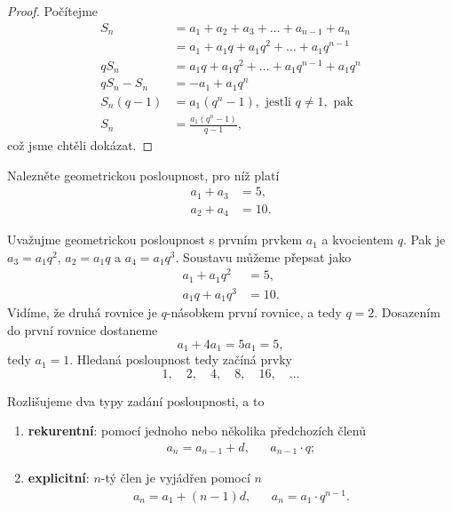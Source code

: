 \begin{proof}
Počítejme
\begin{align*}
    S_n &= a_1+a_2+a_3+\dots+a_{n-1}+a_n \\
    &= a_1 + a_1q+ a_1q^2+ \dots + a_1q^{n-1}\\
    qS_n &= a_1q + a_1q^2 +  \dots + a_1q^{n-1} + a_1q^n\\
    qS_n-S_n &= -a_1+a_1q^n\\
    S_n(q-1) &= a_1(q^n-1), \textrm{ jestli } q\ne 1, \textrm{ pak}\\
    S_n &= \frac{a_1(q^n-1)}{q-1},
\end{align*}
což jsme chtěli dokázat. \qedhere
\end{proof}

\begin{priklad}
Nalezněte geometrickou posloupnost, pro níž platí
\begin{align*}
    a_1+a_3 &=5,\\
    a_2+a_4 &= 10.
\end{align*}
\end{priklad}

\begin{reseni}
Uvažujme geometrickou posloupnost s prvním prvkem $a_1$ a kvocientem $q$. Pak je $a_3 = a_1 q^2$, $a_2 = a_1q$ a
$a_4 = a_1 q^3$. Soustavu můžeme přepsat jako
\begin{align*}
	a_1 + a_1q^2 &= 5, \\
	a_1q + a_1q^3 &= 10.
\end{align*}
Vidíme, že druhá rovnice je $q$-násobkem první rovnice, a tedy $q=2$. Dosazením do první rovnice dostaneme
$$
    a_1 + 4a_1 = 5a_1 = 5,
$$
tedy $a_1 = 1$. Hledaná posloupnost tedy začíná prvky
$$
 1, \quad 2, \quad 4, \quad 8, \quad 16, \quad \dots
$$
\end{reseni}

\begin{pozn}
    Rozlišujeme dva typy zadání posloupnosti, a to
    \begin{enumerate}[$i.$]
    \item \textbf{rekurentní}: pomocí jednoho nebo několika předchozích členů
    \begin{align*}
        a_n=a_{n-1}+d, & & a_{n-1}\cdot q;
    \end{align*}
   	\item \textbf{explicitní}: $n$-tý člen je vyjádřen pomocí $n$
    \begin{align*}
        a_n=a_1+(n-1)d, & & a_n = a_1\cdot q^{n-1}.
    \end{align*}
    \end{enumerate}
\end{pozn}

